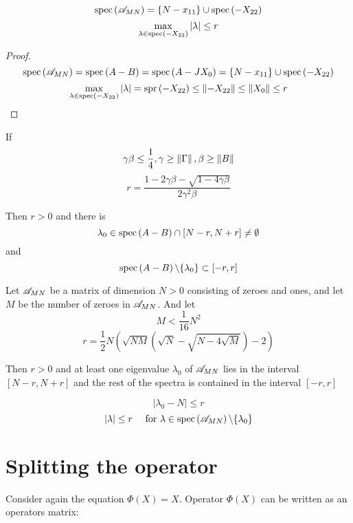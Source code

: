 \documentclass{article}
\begin{document}
\begin{propose}
    \[ \mathrm{spec}\left({\mathscr{A}_{{M}{N}}}\right)  = \left\{N - x_{11}\right\} \cup \mathrm{spec}\left({-X_{22}}\right) \]
    \[ \max_{\lambda\in\mathrm{spec}\left({-X_{22}}\right)} \left|\lambda\right| \leq r \]
\end{propose}
\begin{proof}
    \[ \mathrm{spec}\left({\mathscr{A}_{{M}{N}}}\right) = \mathrm{spec}\left({A-B}\right) = \mathrm{spec}\left({A-JX_0}\right) = \{N - x_{11}\} \cup \mathrm{spec}\left({-X_{22}}\right) \]
    \[ \max_{\lambda\in\mathrm{spec}\left({-X_{22}}\right)} \left|\lambda\right| = \mathrm{spr}\left({-X_{22}}\right) \leq \left\|{-X_{22}}\right\| \leq \left\|{X_0}\right\| \leq r \]
\end{proof}

\begin{lemma}
    If
    \[\gamma\beta\leq\frac14, \gamma\geq\left\|{\Gamma}\right\|, \beta\geq\left\|{B}\right\|\]
    \[r = \frac{1 - 2\gamma\beta - \sqrt{1-4\gamma\beta}}{2 \gamma^2 \beta}\]

    Then $r>0$ and there is
	\[ \lambda_0\in\mathrm{spec}\left({A-B}\right) \cap \left[N-r,N+r\right] \neq\emptyset \]
	and
	\[ \mathrm{spec}\left({A-B}\right)\backslash\{\lambda_0\} \subset \left[-r,r\right] \]
\end{lemma}
\begin{thm}
    Let \( \mathscr{A}_{{M}{N}} \) be a matrix of dimension \( N>0 \) consisting of zeroes and ones,
    and let \( M \) be the number of zeroes in \( \mathscr{A}_{{M}{N}} \).
    And let
    \[ M < \frac{1}{16} N^2 \]
    \[ r = \frac12 N
        \left(
        \sqrt{NM}(\sqrt{N} - \sqrt{N-4\sqrt{M}}) - 2
        \right) \]

    Then $r>0$ and at least one eigenvalue \( \lambda_0 \) of \( \mathscr{A}_{{M}{N}} \) lies in the interval \(\left[N-r,N+r\right]\)
	and the rest of the spectra is contained in the interval \( \left[-r,r\right] \)

    \[ \left|\lambda_0 - N\right| \leq r \]
    \[ \left|\lambda\right| \leq r \quad \text{ for } \lambda\in\mathrm{spec}\left({\mathscr{A}_{{M}{N}}}\right)\backslash\{\lambda_0\} \]
\end{thm}

\section{Splitting the operator}
Consider again the equation \( \Phi(X) = X \).
Operator \( \Phi(X) \) can be written as an operators matrix:
\end{document}
